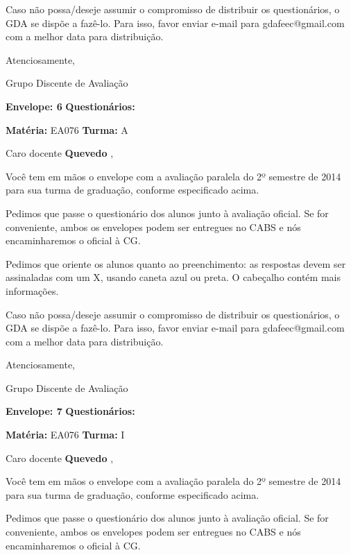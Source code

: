\documentclass[a5paper]{letter}
\begin{document}
	Caso não possa/deseje assumir o compromisso de distribuir os questionários, o GDA se dispõe a fazê-lo. Para isso, favor enviar e-mail para gdafeec@gmail.com com a melhor data para distribuição.


Atenciosamente, 

Grupo Discente de Avaliação

\vspace{0.5cm}

{\bf Envelope: 6 }		\hfill	{\bf Questionários:} \hspace{2cm}

\newpage
\thispagestyle{empty}

\hfill {\bf Matéria:} EA076 {\bf Turma:} A

Caro docente {\bf Quevedo }, 

	Você tem em mãos o envelope com a avaliação paralela do 2º semestre de 2014 para sua turma de graduação, conforme especificado acima.

	Pedimos que passe o questionário dos alunos junto à avaliação oficial. Se for conveniente, ambos os envelopes podem ser entregues no CABS e nós encaminharemos o oficial à CG.

Pedimos que oriente os alunos quanto ao preenchimento: as respostas devem ser assinaladas com um X, usando caneta azul ou preta. O cabeçalho contém mais informações.

	Caso não possa/deseje assumir o compromisso de distribuir os questionários, o GDA se dispõe a fazê-lo. Para isso, favor enviar e-mail para gdafeec@gmail.com com a melhor data para distribuição.


Atenciosamente, 

Grupo Discente de Avaliação

\vspace{0.5cm}

{\bf Envelope: 7 }		\hfill	{\bf Questionários:} \hspace{2cm}

\newpage
\thispagestyle{empty}

\hfill {\bf Matéria:} EA076 {\bf Turma:} I

Caro docente {\bf Quevedo }, 

	Você tem em mãos o envelope com a avaliação paralela do 2º semestre de 2014 para sua turma de graduação, conforme especificado acima.

	Pedimos que passe o questionário dos alunos junto à avaliação oficial. Se for conveniente, ambos os envelopes podem ser entregues no CABS e nós encaminharemos o oficial à CG.
\end{document}

